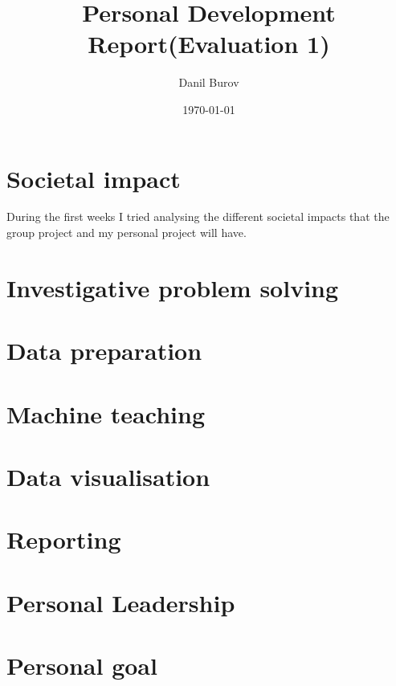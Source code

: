 \documentclass{article}
\title{Personal Development Report(Evaluation 1)}
\author{Danil Burov}
\date{\today}
\begin{document}
\maketitle

\section{Societal impact}
During the first weeks I tried analysing the different societal impacts that the group project and my
personal project will have. 

\section{Investigative problem solving}

\section{Data preparation}

\section{Machine teaching}

\section{Data visualisation}

\section{Reporting}

\section{Personal Leadership}

\section{Personal goal}
\end{document}
